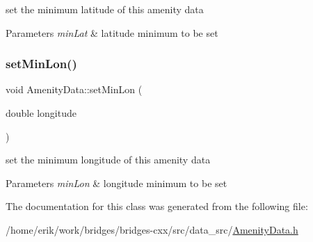 set the minimum latitude of this amenity data 
\begin{DoxyParams}{Parameters}
{\em min\+Lat} & latitude minimum to be set \\
\hline
\end{DoxyParams}
\mbox{\label{class_amenity_data_a30d97355d69c87826da300d87afc85c8}} 
\subsubsection{\texorpdfstring{set\+Min\+Lon()}{setMinLon()}}
{\footnotesize\ttfamily void Amenity\+Data\+::set\+Min\+Lon (\begin{DoxyParamCaption}\item[{double}]{longitude }\end{DoxyParamCaption})\hspace{0.3cm}{\ttfamily [inline]}}

set the minimum longitude of this amenity data 
\begin{DoxyParams}{Parameters}
{\em min\+Lon} & longitude minimum to be set \\
\hline
\end{DoxyParams}


The documentation for this class was generated from the following file\+:\begin{DoxyCompactItemize}
\item 
/home/erik/work/bridges/bridges-\/cxx/src/data\+\_\+src/\hyperlink{_amenity_data_8h}{Amenity\+Data.\+h}\end{DoxyCompactItemize}
